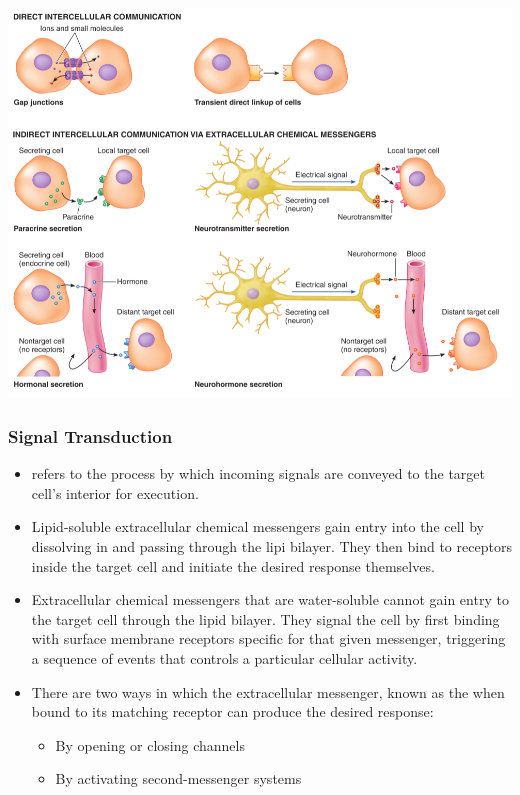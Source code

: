 \documentclass{article}
\numberwithin{equation}{section}
\begin{document}
\begin{itemize}
\begin{itemize}
    \end{itemize}
    \begin{center}
        \includegraphics[width=0.8\linewidth]{figures/communication.png}
    \end{center}
\end{itemize}
\subsubsection{Signal Transduction}
\begin{itemize}
    \item {} refers to the process by which incoming signals are conveyed to the target cell's interior for execution.
    \item Lipid-soluble extracellular chemical messengers gain entry into the cell by dissolving in and passing through the lipi bilayer. They then bind to receptors inside the target cell and initiate the desired response themselves.
    \item Extracellular chemical messengers that are water-soluble cannot gain entry to the target cell through the lipid bilayer. They signal the cell by first binding with surface membrane receptors specific for that given messenger, triggering a sequence of events that controls a particular cellular activity.
    \item There are two ways in which the extracellular messenger, known as the  when bound to its matching receptor can produce the desired response:
    \begin{itemize}
        \item By opening or closing channels
        \item By activating second-messenger systems
    \end{itemize}
\end{itemize}
\end{document}
